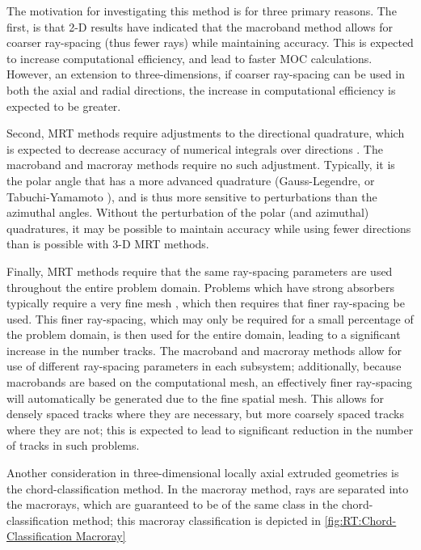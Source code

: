 {{{            The motivation for investigating this method is for three primary reasons.
            The first, is that 2-D results \cite{Yamamoto2005,Fevotte2007,Yamamoto2008} have indicated that the macroband method allows for coarser ray-spacing (thus fewer rays) while maintaining accuracy.
            This is expected to increase computational efficiency, and lead to faster \ac{MOC} calculations.
            However, an extension to three-dimensions, if coarser ray-spacing can be used in both the axial and radial directions, the increase in computational efficiency is expected to be greater.

            Second, \ac{MRT} methods require adjustments to the directional quadrature, which is expected to decrease accuracy of numerical integrals over directions \cite{Kochunas2013}.
            The macroband and macroray methods require no such adjustment.
            Typically, it is the polar angle that has a more advanced quadrature (Gauss-Legendre, or Tabuchi-Yamamoto \cite{TabuchiYamamotoQuad}), and is thus more sensitive to perturbations than the azimuthal angles.
            Without the perturbation of the polar (and azimuthal) quadratures, it may be possible to maintain accuracy while using fewer directions than is possible with 3-D \ac{MRT} methods.

            Finally, \ac{MRT} methods require that the same ray-spacing parameters are used throughout the entire problem domain.
            Problems which have strong absorbers typically require a very fine mesh \cite{Fitzgerald2019}, which then requires that finer ray-spacing be used.
            This finer ray-spacing, which may only be required for a small percentage of the problem domain, is then used for the entire domain, leading to a significant increase in the number tracks.
            The macroband and macroray methods allow for use of different ray-spacing parameters in each subsystem; additionally, because macrobands are based on the computational mesh, an effectively finer ray-spacing will automatically be generated due to the fine spatial mesh.
            This allows for densely spaced tracks where they are necessary, but more coarsely spaced tracks where they are not; this is expected to lead to significant reduction in the number of tracks in such problems.

            Another consideration in three-dimensional locally axial extruded geometries is the chord-classification method.
            In the macroray method, rays are separated into the macrorays, which are guaranteed to be of the same class in the chord-classification method;
            this macroray classification is depicted in \cref{fig:RT:Chord-Classification Macroray}

}}}
